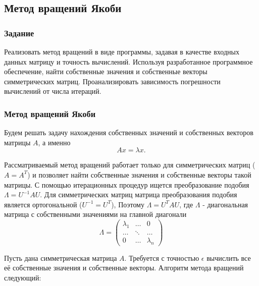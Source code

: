 \documentclass[a4paper,12pt]{article}
\begin{document}
\subsection{Метод вращений Якоби}
\subsubsection{Задание}
Реализовать метод вращений в виде программы, задавая в качестве входных
данных матрицу и точность вычислений. Используя разработанное программное
обеспечение, найти собственные значения и собственные векторы
симметрических матриц. Проанализировать зависимость погрешности
вычислений от числа итераций.

\subsubsection{Метод вращений Якоби}
Будем решать задачу нахождения собственных значений и собственных
векторов матрицы $A$, а именно
$$
Ax = \lambda x.
$$

Рассматриваемый метод вращений работает только для симметрических
матриц ($A = A^{T}$) и позволяет найти собственные значения и
собственные векторы такой матрицы. С помощью итерационных
процедур ищется преобразование подобия $\Lambda = U^{-1} A U$.
Для симметрических матриц матрица преобразования подобия
является ортогональной ($U^{-1} = U^{T}$), Поэтому
$\Lambda = U^{T} A U$, где $\Lambda$ - диагональная матрица с
собственными значениями на главной диагонали
$$
\Lambda =
\begin{pmatrix}
    \lambda_1 & \ldots & 0 \\
    \ldots & \ddots & \ldots \\
    0 & \ldots & \lambda_n
\end{pmatrix}
$$

Пусть дана симметрическая матрица $A$. Требуется с точностью
$\epsilon$ вычислить все её собственные значения и собственные
векторы. Алгоритм метода вращений следующий:
\end{document}

